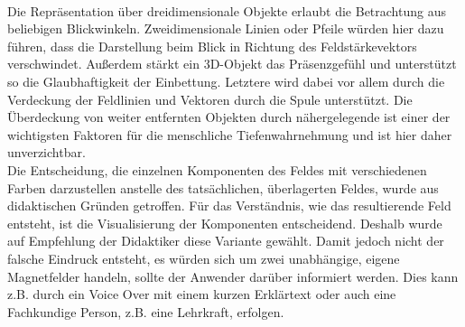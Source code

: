\vspace{8px}
\begin{center}
	\\
\end{center}
\vspace{6px}

Die Repräsentation über dreidimensionale Objekte erlaubt die Betrachtung aus beliebigen Blickwinkeln. Zweidimensionale Linien oder Pfeile würden hier dazu führen, dass die Darstellung beim Blick in Richtung des Feldstärkevektors verschwindet. Außerdem stärkt ein 3D-Objekt das Präsenzgefühl und unterstützt so die Glaubhaftigkeit der Einbettung. Letztere wird dabei vor allem durch die Verdeckung der Feldlinien und Vektoren durch die Spule unterstützt. Die Überdeckung von weiter entfernten Objekten durch nähergelegende ist einer der wichtigsten Faktoren für die menschliche Tiefenwahrnehmung und ist hier daher unverzichtbar.\\

Die Entscheidung, die einzelnen Komponenten des Feldes mit verschiedenen Farben darzustellen anstelle des tatsächlichen, überlagerten Feldes, wurde aus didaktischen Gründen getroffen. Für das Verständnis, wie das resultierende Feld entsteht, ist die Visualisierung der Komponenten entscheidend. Deshalb wurde auf Empfehlung der Didaktiker diese Variante gewählt. Damit jedoch nicht der falsche Eindruck entsteht, es würden sich um zwei unabhängige, eigene Magnetfelder handeln, sollte der Anwender darüber informiert werden. Dies kann z.B. durch ein Voice Over mit einem kurzen Erklärtext oder auch eine Fachkundige Person, z.B. eine Lehrkraft, erfolgen.\\

